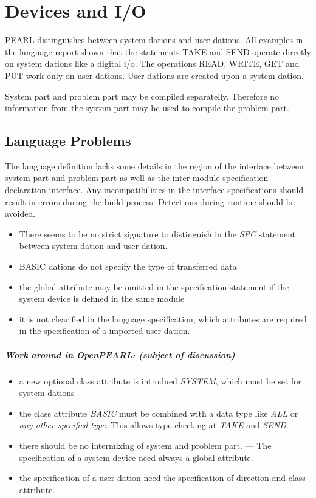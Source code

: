 \chapter{Devices and I/O}

PEARL distinguishes between system dations and user dations.
All examples in the language report shown that the statements TAKE and SEND
operate directly on system dations like a digital i/o.
The operations READ, WRITE, GET and PUT work only on user dations.
User dations are created upon a system dation.

System part and problem part may be compiled separatelly. Therefore 
no information from the system part may be used to compile the problem part.

\section{Language Problems}
The language definition lacks some details in the region of the
interface between system part and problem part as well as the 
inter module specification declaration interface.
Any incompatibilities in the interface specifications should result in
errors during the build process. Detections during runtime should be avoided.

\begin{itemize}
\item There seems to be no strict signature to distinguish
 in the {\em SPC} statement between system dation and user dation.
\item BASIC dations do not specify the type of transferred data
\item the global attribute may be omitted in the specification statement
  if the system device is defined in the same module
\item it is not clearified in the language specification, which attributes
   are required in the specification of a imported user dation.
\end{itemize}

\paragraph{Work around in OpenPEARL: ({\em subject of discussion}) }
\begin{itemize}
\item a new optional class attribute is introdued {\em SYSTEM}, which
   must be set for system dations
\item the class attribute {\em BASIC} must be combined with a data type
    like {\em ALL} or {\em any other specified type}. This allows
    type checking at {\em TAKE} and {\em SEND}.
\item there should be no intermixing of system and problem part.  ---
   The specification of a system device need always a global attribute.
\item the specification of a user dation need the specification of direction
   and class attribute.
\end{itemize}

